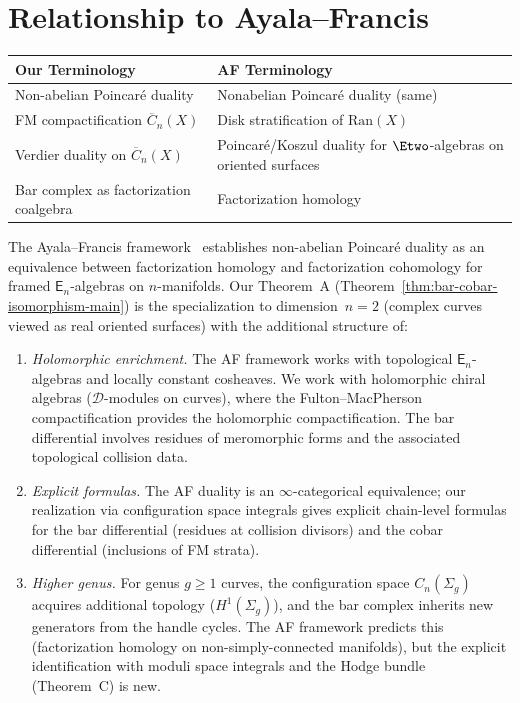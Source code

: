 \section{Relationship to Ayala--Francis}

\begin{tabular}{>{\raggedright\arraybackslash}p{}>{\raggedright\arraybackslash}p{}}
\textbf{Our Terminology} & \textbf{AF Terminology} \\
\hline
Non-abelian Poincar\'{e} duality & Nonabelian Poincar\'{e} duality (same) \\
FM compactification $\overline{C}_n(X)$ & Disk stratification of $\mathrm{Ran}(X)$ \\
Verdier duality on $\overline{C}_n(X)$ & Poincar\'{e}/Koszul duality for $\Etwo$-algebras on oriented surfaces \\
Bar complex as factorization coalgebra & Factorization homology \\
\end{tabular}

\begin{remark}\label{rem:ayala-francis-comparison}
The Ayala--Francis framework~\cite{AF15, AF20} establishes non-abelian
Poincar\'{e} duality as an equivalence between factorization homology and
factorization cohomology for framed $\mathsf{E}_n$-algebras on $n$-manifolds.
Our Theorem~A (Theorem~\ref{thm:bar-cobar-isomorphism-main}) is the
specialization to dimension~$n = 2$ (complex curves viewed as real
oriented surfaces) with the additional
structure of:
\begin{enumerate}[label=(\roman*)]
\item \emph{Holomorphic enrichment.}
	 The AF framework works with topological $\mathsf{E}_n$-algebras and
	 locally constant cosheaves. We work with holomorphic chiral algebras
	 ($\mathcal{D}$-modules on curves), where the Fulton--MacPherson
	 compactification provides the holomorphic compactification. The bar
	 differential involves residues of meromorphic forms and the
	 associated topological collision data.
\item \emph{Explicit formulas.}
 The AF duality is an $\infty$-categorical equivalence; our realization
 via configuration space integrals gives explicit chain-level formulas
 for the bar differential (residues at collision divisors) and the
 cobar differential (inclusions of FM strata).
\item \emph{Higher genus.}
 For genus $g \geq 1$ curves, the configuration space
 $C_n(\Sigma_g)$ acquires additional topology ($H^1(\Sigma_g)$),
 and the bar complex inherits new generators from the handle
 cycles. The AF framework predicts this (factorization homology
 on non-simply-connected manifolds), but the explicit identification
 with moduli space integrals and the Hodge bundle (Theorem~C)
 is new.
\end{enumerate}
\end{remark}

